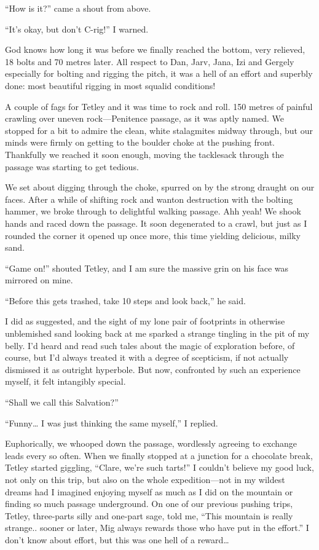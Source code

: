 ``How is it?'' came a shout from above.

``It's okay, but don't C-rig!'' I warned.

God knows how long it was before we finally reached the bottom, very
relieved, 18 bolts and 70 metres later. All respect to Dan, Jarv, Jana,
Izi and Gergely especially for bolting and rigging the pitch, it was a
hell of an effort and superbly done: most beautiful rigging in most
squalid conditions!

A couple of fags for Tetley and it was time to rock and roll. 150 metres
of painful crawling over uneven rock---Penitence passage, as it was
aptly named. We stopped for a bit to admire the clean, white stalagmites
midway through, but our minds were firmly on getting to the boulder
choke at the pushing front. Thankfully we reached it soon enough, moving
the tacklesack through the passage was starting to get tedious.

We set about digging through the choke, spurred on by the strong draught
on our faces. After a while of shifting rock and wanton destruction with
the bolting hammer, we broke through to delightful walking passage. Ahh
yeah! We shook hands and raced down the passage. It soon degenerated to
a crawl, but just as I rounded the corner it opened up once more, this
time yielding delicious, milky sand.

``Game on!'' shouted Tetley, and I am sure the massive grin on his face
was mirrored on mine.

``Before this gets trashed, take 10 steps and look back,'' he said.

I did as suggested, and the sight of my lone pair of footprints in
otherwise unblemished sand looking back at me sparked a strange tingling
in the pit of my belly. I'd heard and read such tales about the magic of
exploration before, of course, but I'd always treated it with a degree
of scepticism, if not actually dismissed it as outright hyperbole. But
now, confronted by such an experience myself, it felt intangibly
special.

``Shall we call this Salvation?''

``Funny\ldots{} I was just thinking the same myself,'' I replied.

Euphorically, we whooped down the passage, wordlessly agreeing to
exchange leads every so often. When we finally stopped at a junction for
a chocolate break, Tetley started giggling, ``Clare, we're such tarts!''
I couldn't believe my good luck, not only on this trip, but also on the
whole expedition---not in my wildest dreams had I imagined enjoying
myself as much as I did on the mountain or finding so much passage
underground. On one of our previous pushing trips, Tetley, three-parts
silly and one-part sage, told me, ``This mountain is really strange..
sooner or later, Mig always rewards those who have put in the effort.''
I don't know about effort, but this was one hell of a reward\ldots{}

